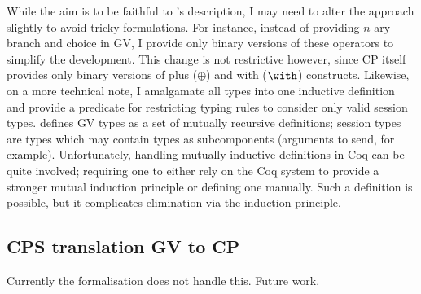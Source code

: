 While the aim is to be faithful to \citeauthor{Wadler:2014}'s description, I
may need to alter the approach slightly to avoid tricky formulations. For
instance, instead of providing $n$-ary branch and choice in GV, I provide
only binary versions of these operators to simplify the development. This
change is not restrictive however, since CP itself provides only binary
versions of plus ($\oplus$) and with ($\with$) constructs. Likewise, on a more
technical note, I amalgamate all types into one inductive definition and
provide a predicate for restricting typing rules to consider only valid
session types. \citeauthor{Wadler:2014} defines GV types as a set of mutually
recursive definitions; session types are types which may contain types as
subcomponents (arguments to send, for example). Unfortunately, handling
mutually inductive definitions in Coq can be quite involved; requiring one to
either rely on the Coq system to provide a stronger mutual induction principle
or defining one manually. Such a definition is possible, but it complicates
elimination via the induction principle.

\subsection{CPS translation GV to CP}

Currently the formalisation does not handle this. Future work.
